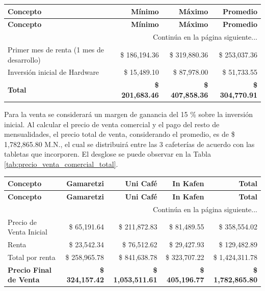 \begin{tabularx}{\textwidth}{X r r r}
\caption{Inversión inicial.} \label{tab:inversion_inicial_hibrida}\\
\toprule
\textbf{Concepto} & \textbf{Mínimo} & \textbf{Máximo} & \textbf{Promedio} \\
\midrule
\endfirsthead

\toprule
\textbf{Concepto} & \textbf{Mínimo} & \textbf{Máximo} & \textbf{Promedio} \\
\midrule
\endhead

\midrule
\multicolumn{4}{r}{\small Continúa en la página siguiente...} \\
\endfoot
\bottomrule
\endlastfoot

Primer mes de renta (1 mes de desarrollo) & \$ 186,194.36 & \$ 319,880.36 & \$ 253,037.36 \\
\addlinespace
Inversión inicial de Hardware & \$ 15,489.10 & \$ 87,978.00 & \$ 51,733.55 \\
\addlinespace
\midrule
\textbf{Total} & \textbf{\$ 201,683.46} & \textbf{\$ 407,858.36} & \textbf{\$ 304,770.91} \\
\end{tabularx}
\endgroup

Para la venta se considerará un margen de ganancia del 15 \% sobre la inversión inicial. Al calcular el precio de venta comercial y el pago del resto de mensualidades, el precio total de venta, considerando el promedio, es de \$ 1,782,865.80 M.N., el cual se distribuirá entre las 3 cafeterías de acuerdo con las tabletas que incorporen. El desglose se puede observar en la Tabla \ref{tab:precio_venta_comercial_total}.

\begingroup
\setlength{\LTleft}{\fill}
\setlength{\LTright}{\fill}

\begin{tabularx}{\textwidth}{X r r r r}
\caption{Precio de venta comercial total por cafetería.} \label{tab:precio_venta_comercial_total}\\
\toprule
\textbf{Concepto} & \textbf{Gamaretzi} & \textbf{Uni Café} & \textbf{In Kafen} & \textbf{Total} \\
\midrule
\endfirsthead

\toprule
\textbf{Concepto} & \textbf{Gamaretzi} & \textbf{Uni Café} & \textbf{In Kafen} & \textbf{Total} \\
\midrule
\endhead

\midrule
\multicolumn{5}{r}{\small Continúa en la página siguiente...} \\
\endfoot
\bottomrule
\endlastfoot

Precio de Venta Inicial & \$ 65,191.64 & \$ 211,872.83 & \$ 81,489.55 & \$ 358,554.02 \\
\addlinespace
Renta & \$ 23,542.34 & \$ 76,512.62 & \$ 29,427.93 & \$ 129,482.89 \\
\addlinespace
Total por renta & \$ 258,965.78 & \$ 841,638.78 & \$ 323,707.22 & \$ 1,424,311.78 \\
\addlinespace
\midrule
\textbf{Precio Final de Venta} & \textbf{\$ 324,157.42} & \textbf{\$ 1,053,511.61} & \textbf{\$ 405,196.77} & \textbf{\$ 1,782,865.80} \\
\end{tabularx}
\endgroup


